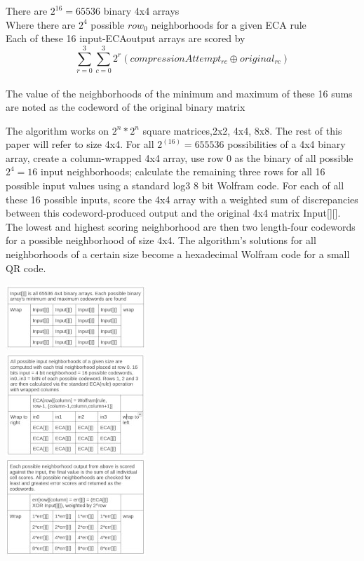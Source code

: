 \documentclass[11pt]{article}
\begin{document}
\begin{center}
There are $2^{16}=65536$ binary 4x4 arrays\\
 Where there are $2^4$ possible $row_0$ neighborhoods for a given ECA rule\\
 Each of these 16 input-ECAoutput arrays are scored by\\
\[  \sum_{r=0}^{3} \sum_{c=0}^{3} 2^r ( compressionAttempt_{r c} \oplus original_{r c}) \]\\
 The value of the neighborhoods of the minimum and maximum of these 16 sums are noted as the codeword of the original binary matrix  \\
\end{center}
The algorithm works on $2^n*2^n$ square matrices,2x2, 4x4, 8x8. The rest of this paper will refer to size 4x4. For all $2^(16)=655536$ possibilities of a 4x4 binary array, create a column-wrapped 4x4 array, use row 0 as the binary of all possible $2^4=16$ input neighborhoods; calculate the remaining three rows for all 16 possible input values using a standard log3 8 bit Wolfram code. For each of all these 16 possible inputs, score the 4x4 array with a weighted sum of discrepancies between this codeword-produced output and the original 4x4 matrix Input[][]. The lowest and highest scoring neighborhood are then two length-four codewords for a possible neighborhood of size 4x4. The algorithm's solutions for all neighborhoods of a certain size become a hexadecimal Wolfram code for a small QR code.  \\
\begin{center}
\includegraphics{inputGrid}\\
\includegraphics{ecaGrid}\\
\includegraphics{errorGrid}\\
\end{center}
\end{document}
